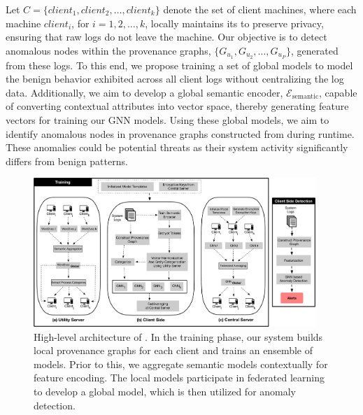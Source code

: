 Let \( C = \{client_1, client_2, \ldots, client_k\} \) denote the set of client machines, where each machine \( client_i \), for \( i = 1, 2, \ldots, k \), locally maintains its \logs to preserve privacy, ensuring that raw logs do not leave the machine. Our objective is to detect anomalous nodes within the provenance graphs, \( \{G_{u_1}, G_{u_2}, \ldots, G_{u_P}\} \), generated from these logs. To this end, we propose training a set of global \gnnshort models to model the benign behavior exhibited across all client logs without centralizing the log data. Additionally, we aim to develop a global semantic encoder, \( \mathcal{E}_{\text{semantic}} \), capable of converting contextual attributes into vector space, thereby generating feature vectors for training our GNN models. Using these global \gnnshort models, we aim to identify anomalous nodes in provenance graphs constructed from \logs during runtime. These anomalies could be potential threats as their system activity significantly differs from benign patterns.



\begin{figure}[t!]
  \centering
  \includegraphics[width=0.95\textwidth]{fig/archv3.pdf}
  \caption{High-level architecture of \Sys. In the training phase, our system builds local provenance graphs for each client and trains an ensemble of \gnnshort models. Prior to this, we aggregate semantic models contextually for feature encoding. The local \gnnshort models participate in federated learning to develop a global \gnnshort model, which is then utilized for anomaly detection.}
  \vspace{-3ex}
  \label{fig:arch}
\end{figure}

